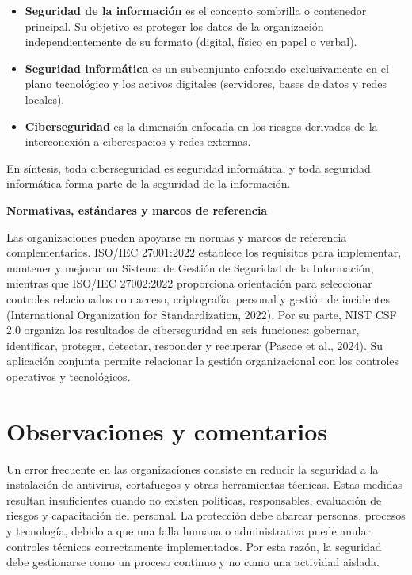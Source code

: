 \documentclass[12pt]{article}
\begin{document}
	\begin{itemize}
		
		\item \textbf{Seguridad de la información} es el concepto sombrilla o contenedor principal. Su objetivo es proteger los datos de la organización independientemente de su formato (digital, físico en papel o verbal).
		\item \textbf{Seguridad informática} es un subconjunto enfocado exclusivamente en el plano tecnológico y los activos digitales (servidores, bases de datos y redes locales).
		\item \textbf{Ciberseguridad} es la dimensión enfocada en los riesgos derivados de la interconexión a ciberespacios y redes externas.
		
	\end{itemize}
	En síntesis, toda ciberseguridad es seguridad informática, y toda seguridad informática forma parte de la seguridad de la información.
	
	\textbf{Normativas, estándares y marcos de referencia}
	
	Las organizaciones pueden apoyarse en normas y marcos de referencia complementarios. ISO/IEC 27001:2022 establece los requisitos para implementar, mantener y mejorar un Sistema de Gestión de Seguridad de la Información, mientras que ISO/IEC 27002:2022 proporciona orientación para seleccionar controles relacionados con acceso, criptografía, personal y gestión de incidentes (International Organization for Standardization, 2022). Por su parte, NIST CSF 2.0 organiza los resultados de ciberseguridad en seis funciones: gobernar, identificar, proteger, detectar, responder y recuperar (Pascoe et al., 2024). Su aplicación conjunta permite relacionar la gestión organizacional con los controles operativos y tecnológicos.
	
	\section*{Observaciones y comentarios}
	
	Un error frecuente en las organizaciones consiste en reducir la seguridad a la instalación de antivirus, cortafuegos y otras herramientas técnicas. Estas medidas resultan insuficientes cuando no existen políticas, responsables, evaluación de riesgos y capacitación del personal. La protección debe abarcar personas, procesos y tecnología, debido a que una falla humana o administrativa puede anular controles técnicos correctamente implementados. Por esta razón, la seguridad debe gestionarse como un proceso continuo y no como una actividad aislada.
	
\end{document}
